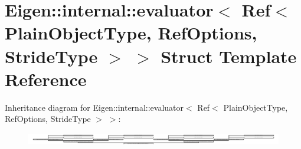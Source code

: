 \hypertarget{struct_eigen_1_1internal_1_1evaluator_3_01_ref_3_01_plain_object_type_00_01_ref_options_00_01_stride_type_01_4_01_4}{}\section{Eigen\+:\+:internal\+:\+:evaluator$<$ Ref$<$ Plain\+Object\+Type, Ref\+Options, Stride\+Type $>$ $>$ Struct Template Reference}
\label{struct_eigen_1_1internal_1_1evaluator_3_01_ref_3_01_plain_object_type_00_01_ref_options_00_01_stride_type_01_4_01_4}
Inheritance diagram for Eigen\+:\+:internal\+:\+:evaluator$<$ Ref$<$ Plain\+Object\+Type, Ref\+Options, Stride\+Type $>$ $>$\+:\begin{figure}[H]
\begin{center}
\leavevmode
\includegraphics[height=0.565428cm]{struct_eigen_1_1internal_1_1evaluator_3_01_ref_3_01_plain_object_type_00_01_ref_options_00_01_stride_type_01_4_01_4}
\end{center}
\end{figure}
